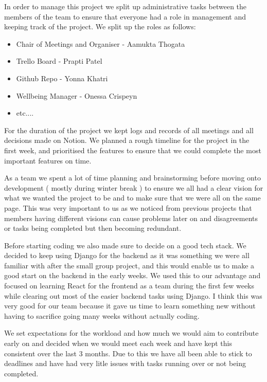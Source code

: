In order to manage this project we split up administrative tasks between the members of the team to ensure that everyone had a role in management and keeping track of the project. We split up the roles as follows:

\begin{itemize}
    \item Chair of Meetings and Organiser - Aamukta Thogata
    \item Trello Board - Prapti Patel
    \item Github Repo - Yonna Khatri
    \item Wellbeing Manager - Onessa Crispeyn
    \item etc....
\end{itemize}

For the duration of the project we kept logs and records of all meetings and all decisions made on Notion. We planned a rough timeline for the project in the first week, and prioritised the features to ensure that we could complete the most important features on time.

As a team we spent a lot of time planning and brainstorming before moving onto development ( mostly during winter break ) to ensure we all had a clear vision for what we wanted the project to be and to make sure that we were all on the same page. This was very important to us as we noticed from previous projects that members having different visions can cause problems later on and disagreements or tasks being completed but then becoming redundant.

Before starting coding we also made sure to decide on a good tech stack. We decided to keep using Django for the backend as it was something we were all familiar with after the small group project, and this would enable us to make a good start on the backend in the early weeks. We used this to our advantage and focused on learning React for the frontend as a team during the first few weeks while clearing out most of the easier backend tasks using Django. I think this was very good for our team because it gave us time to learn something new without having to sacrifice going many weeks without actually coding.

We set expectations for the workload and how much we would aim to contribute early on and decided when we would meet each week and have kept this consistent over the last 3 months. Due to this we have all been able to stick to deadlines and have had very litle issues with tasks running over or not being completed.

